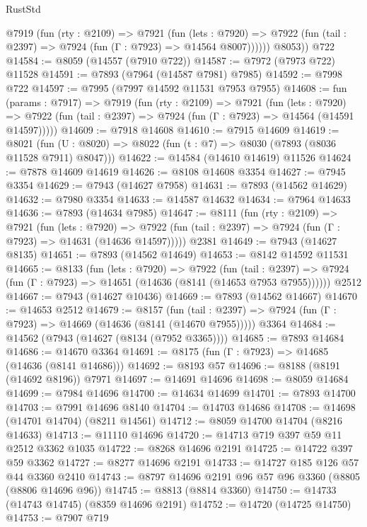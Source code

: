 \begin{lexlean}{RustStd}
\begin{coremodule}
{\begin{coremodule}
{{{{{{{{{{{{{{{{{{{{{{{{{{{{{{{{{{{{{{{{{{{{{{{{{{          @7919
            (fun (rty : @2109) =>
            @7921
              (fun (lets : @7920) =>
              @7922 (fun (tail : @2397) => @7924 (fun (Γ : @7923) => @14564 @8007))))))
        @8053))
    @722
@14584 := @8059 (@14557 (@7910 @722))
@14587 := @7972 (@7973 @722) @11528
@14591 := @7893 (@7964 (@14587 @7981) @7985)
@14592 := @7998 @722
@14597 := @7995 (@7997 @14592 @11531 @7953 @7955)
@14608 := fun (params : @7917) =>
  @7919
    (fun (rty : @2109) =>
    @7921
      (fun (lets : @7920) =>
      @7922 (fun (tail : @2397) => @7924 (fun (Γ : @7923) => @14564 (@14591 @14597)))))
@14609 := @7918 @14608
@14610 := @7915 @14609
@14619 := @8021
    (fun (U : @8020) => @8022 (fun (t : @7) => @8030 (@7893 (@8036 @11528 @7911) @8047)))
@14622 := @14584 (@14610 @14619) @11526
@14624 := @7878 @14609 @14619
@14626 := @8108 @14608 @3354
@14627 := @7945 @3354
@14629 := @7943 (@14627 @7958)
@14631 := @7893 (@14562 @14629)
@14632 := @7980 @3354
@14633 := @14587 @14632
@14634 := @7964 @14633
@14636 := @7893 (@14634 @7985)
@14647 := @8111
    (fun (rty : @2109) =>
    @7921
      (fun (lets : @7920) =>
      @7922 (fun (tail : @2397) => @7924 (fun (Γ : @7923) => @14631 (@14636 @14597)))))
    @2381
@14649 := @7943 (@14627 @8135)
@14651 := @7893 (@14562 @14649)
@14653 := @8142 @14592 @11531
@14665 := @8133
    (fun (lets : @7920) =>
    @7922
      (fun (tail : @2397) =>
      @7924 (fun (Γ : @7923) => @14651 (@14636 (@8141 (@14653 @7953 @7955))))))
    @2512
@14667 := @7943 (@14627 @10436)
@14669 := @7893 (@14562 @14667)
@14670 := @14653 @2512
@14679 := @8157
    (fun (tail : @2397) => @7924 (fun (Γ : @7923) => @14669 (@14636 (@8141 (@14670 @7955)))))
    @3364
@14684 := @14562 (@7943 (@14627 (@8134 (@7952 @3365))))
@14685 := @7893 @14684
@14686 := @14670 @3364
@14691 := @8175 (fun (Γ : @7923) => @14685 (@14636 (@8141 @14686)))
@14692 := @8193 @57
@14696 := @8188 (@8191 (@14692 @8196)) @7971
@14697 := @14691 @14696
@14698 := @8059 @14684
@14699 := @7984 @14696
@14700 := @14634 @14699
@14701 := @7893 @14700
@14703 := @7991 @14696 @8140
@14704 := @14703 @14686
@14708 := @14698 (@14701 @14704) (@8211 @14561)
@14712 := @8059 @14700 @14704 (@8216 @14633)
@14713 := @11110 @14696
@14720 := @14713 @719 @397 @59 @11 @2512 @3362 @1035
@14722 := @8268 @14696 @2191
@14725 := @14722 @397 @59 @3362
@14727 := @8277 @14696 @2191
@14733 := @14727 @185 @126 @57 @44 @3360 @2410
@14743 := @8797 @14696 @2191 @96 @57 @96 @3360 (@8805 (@8806 @14696 @96))
@14745 := @8813 (@8814 @3360)
@14750 := @14733 (@14743 @14745) (@8359 @14696 @2191)
@14752 := @14720 (@14725 @14750)
@14753 := @7907 @719
}}}}}}}}}}}}}}}}}}}}}}}}}}}}}}}}}}}}}}}}}}}}}}}}}}
\end{coremodule}}
\end{coremodule}
\end{lexlean}
